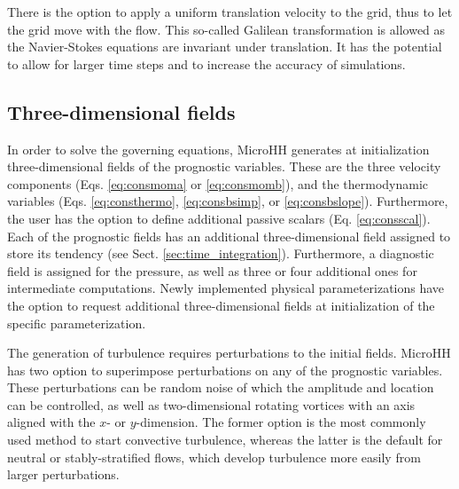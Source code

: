 \documentclass[gmd,manuscript]{copernicus}
\begin{document}
There is the option to apply a uniform translation velocity to the grid, thus to let the grid move with the flow. This so-called Galilean transformation is allowed as the Navier-Stokes equations are invariant under translation. It has the potential to allow for larger time steps and to increase the accuracy of simulations.

\subsection{Three-dimensional fields}
In order to solve the governing equations, MicroHH generates at initialization three-dimensional fields of the prognostic variables. These are the three velocity components (Eqs. \ref{eq:consmoma} or \ref{eq:consmomb}), and the thermodynamic variables (Eqs. \ref{eq:consthermo}, \ref{eq:consbsimp}, or \ref{eq:consbslope}). Furthermore, the user has the option to define additional passive scalars (Eq. \ref{eq:consscal}). Each of the prognostic fields has an additional three-dimensional field assigned to store its tendency (see Sect. \ref{sec:time_integration}). Furthermore, a diagnostic field is assigned for the pressure, as well as three or four additional ones for intermediate computations. Newly implemented physical parameterizations have the option to request additional three-dimensional fields at initialization of the specific parameterization.

The generation of turbulence requires perturbations to the initial fields. MicroHH has two option to superimpose perturbations on any of the prognostic variables. These perturbations can be random noise of which the amplitude and location can be controlled, as well as two-dimensional rotating vortices with an axis aligned with the $x$- or $y$-dimension. The former option is the most commonly used method to start convective turbulence, whereas the latter is the default for neutral or stably-stratified flows, which develop turbulence more easily from larger perturbations.
\end{document}
